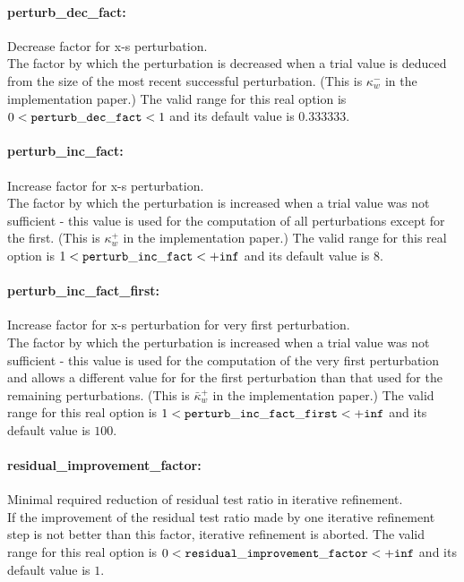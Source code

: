 \paragraph{perturb\_dec\_fact:}\label{sec:perturb_dec_fact} Decrease factor for x-s perturbation. $\;$ \\
 The factor by which the perturbation is decreased
when a trial value is deduced from the size of
the most recent successful perturbation. (This is
$\kappa_w^-$ in the implementation paper.) The valid range for this real option is 
$0 <  {\tt perturb\_dec\_fact } <  1$
and its default value is $0.333333$.


\paragraph{perturb\_inc\_fact:}\label{sec:perturb_inc_fact} Increase factor for x-s perturbation. $\;$ \\
 The factor by which the perturbation is increased
when a trial value was not sufficient - this
value is used for the computation of all
perturbations except for the first. (This is
$\kappa_w^+$ in the implementation paper.) The valid range for this real option is 
$1 <  {\tt perturb\_inc\_fact } <  {\tt +inf}$
and its default value is $8$.


\paragraph{perturb\_inc\_fact\_first:}\label{sec:perturb_inc_fact_first} Increase factor for x-s perturbation for very first perturbation. $\;$ \\
 The factor by which the perturbation is increased
when a trial value was not sufficient - this
value is used for the computation of the very
first perturbation and allows a different value
for for the first perturbation than that used for
the remaining perturbations. (This is
$\bar\kappa_w^+$ in the implementation paper.) The valid range for this real option is 
$1 <  {\tt perturb\_inc\_fact\_first } <  {\tt +inf}$
and its default value is $100$.


\paragraph{residual\_improvement\_factor:}\label{sec:residual_improvement_factor} Minimal required reduction of residual test ratio in iterative refinement. $\;$ \\
 If the improvement of the residual test ratio
made by one iterative refinement step is not
better than this factor, iterative refinement is
aborted. The valid range for this real option is 
$0 <  {\tt residual\_improvement\_factor } <  {\tt +inf}$
and its default value is $1$.


